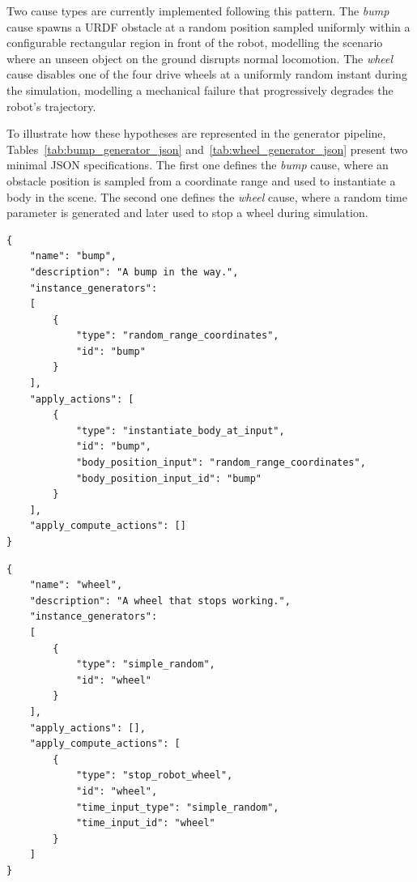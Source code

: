 \documentclass[a4paper, twoside]{article}
\begin{document}
Two cause types are currently implemented following this pattern.
The \emph{bump} cause spawns a URDF obstacle at a random position sampled uniformly within a configurable rectangular region in front of the robot, modelling the scenario where an unseen object on the ground disrupts normal locomotion.
The \emph{wheel} cause disables one of the four drive wheels at a uniformly random instant during the simulation, modelling a mechanical failure that progressively degrades the robot's trajectory.

To illustrate how these hypotheses are represented in the generator pipeline, Tables~\ref{tab:bump_generator_json} and~\ref{tab:wheel_generator_json} present two minimal JSON specifications.
The first one defines the \emph{bump} cause, where an obstacle position is sampled from a coordinate range and used to instantiate a body in the scene.
The second one defines the \emph{wheel} cause, where a random time parameter is generated and later used to stop a wheel during simulation.

\begin{table}[H]
\centering
\caption{Example JSON specification for the \texttt{bump} cause generator.}
\label{tab:bump_generator_json}
\begin{lstlisting}
{
    "name": "bump",
    "description": "A bump in the way.",
    "instance_generators": 
    [
        {
            "type": "random_range_coordinates",
            "id": "bump"
        }
    ],
    "apply_actions": [
        {
            "type": "instantiate_body_at_input",
            "id": "bump",
            "body_position_input": "random_range_coordinates",
            "body_position_input_id": "bump"
        }
    ],
    "apply_compute_actions": []
}
\end{lstlisting}
\end{table}

\newpage

\begin{table}[H]
\centering
\caption{Example JSON specification for the \texttt{wheel} cause generator.}
\label{tab:wheel_generator_json}
\begin{lstlisting}
{
    "name": "wheel",
    "description": "A wheel that stops working.",
    "instance_generators": 
    [
        {
            "type": "simple_random",
            "id": "wheel"
        }
    ],
    "apply_actions": [],
    "apply_compute_actions": [
        {
            "type": "stop_robot_wheel",
            "id": "wheel",
            "time_input_type": "simple_random",
            "time_input_id": "wheel"
        }
    ]
}
\end{lstlisting}
\end{table}
\end{document}
